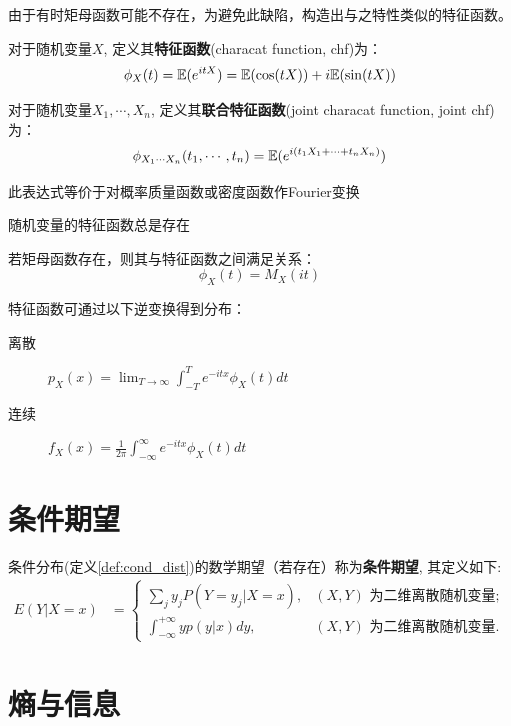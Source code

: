 由于有时矩母函数可能不存在，为避免此缺陷，构造出与之特性类似的特征函数。

\begin{definition}
    对于随机变量$X$, 定义其\textbf{特征函数}(characat function, chf)为：
    \[ \phi_X(t) = \mathbb{E}(e^{itX}) = \mathbb{E}(\cos (tX)) + i\mathbb{E}(\sin (tX))\]

    对于随机变量$X_1,\cdots, X_n$, 定义其\textbf{联合特征函数}(joint characat function, joint chf)为：
    \[ \phi_{X_1\cdots X_n}(t_1,\cdots ,t_n) = \mathbb{E}(e^{i (t_1 X_1+\cdots + t_n X_n)}) \]
\end{definition}

\begin{remark}
    此表达式等价于对概率质量函数或密度函数作Fourier变换
\end{remark}

\begin{proposition}
    随机变量的特征函数总是存在
\end{proposition}

\begin{proposition}
    若矩母函数存在，则其与特征函数之间满足关系：
    \[ \phi_X(t) = M_X(it) \]
\end{proposition}

\begin{theorem}
    特征函数可通过以下逆变换得到分布：
    \begin{description}
        \item[离散] $p_{X}(x)=\lim _{T \rightarrow \infty} \int_{-T}^{T} e^{-i t x} \phi_{X}(t) d t$
        \item[连续] $f_{X}(x)=\frac{1}{2 \pi} \int_{-\infty}^{\infty} e^{-i t x} \phi_{X}(t) d t$
    \end{description}
\end{theorem}

\section{条件期望}

\begin{definition}
    条件分布(定义\ref{def:cond_dist})的数学期望（若存在）称为\textbf{条件期望}, 其定义如下:
    \begin{align*}
        E(Y | X=x) & =\begin{cases} \sum_{j} y_{j} P\left(Y=y_{j} | X=x\right), & (X,Y)\text{ 为二维离散随机变量}; \\
              \int_{-\infty}^{+\infty} y p(y | x) d y,  & (X,Y)\text{ 为二维离散随机变量}.
                      \end{cases}
    \end{align*}
\end{definition}

\section{熵与信息}
